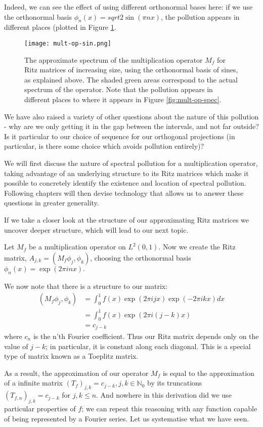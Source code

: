 \documentclass[../main.tex]{subfiles}
\begin{document}
Indeed, we can see the effect of using different orthonormal bases here: if we
use the orthonormal basis $\phi_n(x) = {sqrt{2}}\sin(\pi nx)$, the
pollution appears in different places (plotted in Figure \ref{fig:mult-op-sin}.

\begin{figure}[h]
\centering
\texttt{[image: mult-op-sin.png]}
\caption{The approximate spectrum of the multiplication operator $M_f$ for Ritz
	matrices of increasing size, using the orthonormal basis of sines,
  as explained above.
  The shaded green areas correspond to the
	actual spectrum of the operator. Note that the pollution appears in different
  places to where it appears in Figure \ref{fig:mult-op-spec}.}
\label{fig:mult-op-sin}	
\end{figure}

We have also raised a variety of other questions about the nature of this
pollution - why are we only getting it in the gap between the intervals, and not
far outside? Is it particular to our choice of sequence for our orthogonal
projections (in particular, is there some choice which avoids pollution
entirely)?

We will first discuss the nature of spectral pollution for a multiplication
operator, taking advantage of an underlying structure to its Ritz matrices which
make it possible to concretely identify the existence and location of spectral
pollution. Following chapters will then devise technology that allows us to 
answer these questions in greater generality.

If we take a closer look at the structure of our approximating Ritz matrices we
uncover deeper structure, which will lead to our next topic.
\begin{example}\label{exp:mult-op-toeplitz}
Let $M_f$ be a multiplication operator on $L^2(0, 1)$. Now we create the Ritz
matrix, $A_{j,k} = (M_f \phi_j, \phi_k)$, choosing the orthonormal basis
$\phi_n(x) = \exp(2 \pi i n x).$

We now note that there is a structure to our matrix:
\begin{align*}
(M_f \phi_j, \phi_k) & = \int_0^1 f(x) \exp(2 \pi i j x) \exp(-2 \pi i k x) dx \\
& = \int_0^1 f(x) \exp(2 \pi i (j-k) x)\\
& = c_{j-k}
\end{align*}
where $c_n$ is the n'th Fourier coefficient. Thus our Ritz matrix depends only
on the value of $j-k$; in particular, it is constant along each
diagonal. This is a special type of matrix known as a Toeplitz matrix.
\end{example}
As a result, the approximation of our operator $M_f$ is equal to the
approximation of a infinite matrix $(T_f)_{j,k} = c_{j-k}, j,k \in \mathbb{N}_0$
by its truncations $(T_{f,n})_{j,k} = c_{j-k}$ for $j, k \leq n$. And nowhere in
this derivation did we use particular
properties of $f$; we can repeat this reasoning with any function capable of
being represented by a Fourier series. Let us systematise what we have seen.
\end{document}
